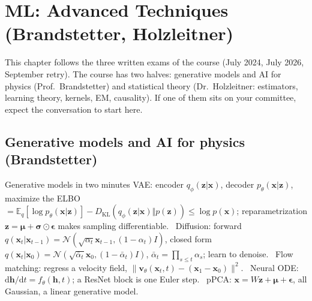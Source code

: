 \section{ML: Advanced Techniques (Brandstetter, Holzleitner)}

This chapter follows the three written exams of the course (July 2024, July 2026, September retry).
The course has two halves: generative models and AI for physics (Prof.\ Brandstetter) and
statistical theory (Dr.\ Holzleitner: estimators, learning theory, kernels, EM, causality). If one
of them sits on your committee, expect the conversation to start here.

\subsection{Generative models and AI for physics (Brandstetter)}

\begin{summary}{Generative models in two minutes}
\textsf{VAE:} encoder $q_\phi(\mathbf{z}|\mathbf{x})$, decoder $p_\theta(\mathbf{x}|\mathbf{z})$,
maximize the ELBO $=\mathbb{E}_q[\log p_\theta(\mathbf{x}|\mathbf{z})]-D_{\mathrm{KL}}(q_\phi(\mathbf{z}|\mathbf{x})\Vert p(\mathbf{z}))\le\log p(\mathbf{x})$;
reparametrization $\mathbf{z}=\bm\mu+\bm\sigma\odot\bm\epsilon$ makes sampling differentiable. \
\textsf{Diffusion:} forward $q(\mathbf{x}_t|\mathbf{x}_{t-1})=\mathcal{N}(\sqrt{\alpha_t}\mathbf{x}_{t-1},(1-\alpha_t)I)$,
closed form $q(\mathbf{x}_t|\mathbf{x}_0)=\mathcal{N}(\sqrt{\bar\alpha_t}\mathbf{x}_0,(1-\bar\alpha_t)I)$,
$\bar\alpha_t=\prod_{s\le t}\alpha_s$; learn to denoise. \
\textsf{Flow matching:} regress a velocity field, $\lVert\mathbf{v}_\theta(\mathbf{x}_t,t)-(\mathbf{x}_1-\mathbf{x}_0)\rVert^2$. \
\textsf{Neural ODE:} $\mathrm{d}\mathbf{h}/\mathrm{d}t=f_\theta(\mathbf{h},t)$; a ResNet block is one Euler step. \
\textsf{pPCA:} $\mathbf{x}=W\mathbf{z}+\bm\mu+\bm\epsilon$, all Gaussian, a linear generative model.
\end{summary}




